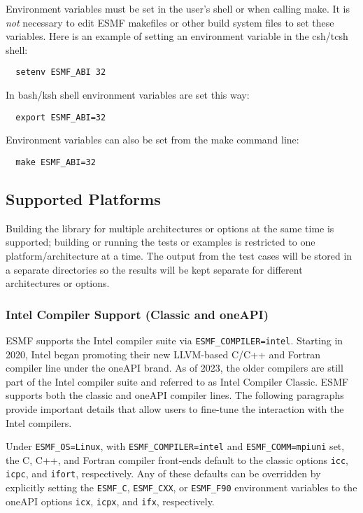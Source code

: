 Environment variables must be set in the user's shell or when calling make. It
is {\em not} necessary to edit ESMF makefiles or other build system files to set
these variables. Here is an example of setting an environment variable in the
csh/tcsh shell:

\begin{verbatim}
  setenv ESMF_ABI 32
\end{verbatim}

In bash/ksh shell environment variables are set this way:

\begin{verbatim}
  export ESMF_ABI=32
\end{verbatim}

Environment variables can also be set from the make command line:

\begin{verbatim}
  make ESMF_ABI=32
\end{verbatim}

\subsection{Supported Platforms}


Building the library for multiple architectures or options at the same
time is supported; building or running the tests or examples is restricted
to one platform/architecture at a time.  The output from the test cases
will be stored in a separate directories so the results will be kept
separate for different architectures or options.

\subsubsection{Intel Compiler Support (Classic and oneAPI)}

ESMF supports the Intel compiler suite via {\tt ESMF\_COMPILER=intel}. Starting in 2020, Intel began promoting their
new LLVM-based C/C++ and Fortran compiler line under the oneAPI brand. As of 2023, the older compilers are still
part of the Intel compiler suite and referred to as Intel Compiler Classic. ESMF supports both the classic and oneAPI
compiler lines. The following paragraphs provide important details that allow users to fine-tune the interaction
with the Intel compilers.

Under {\tt ESMF\_OS=Linux}, with {\tt ESMF\_COMPILER=intel} and {\tt ESMF\_COMM=mpiuni} set, the C, C++, and
Fortran compiler front-ends default to the classic options {\tt icc}, {\tt icpc}, and {\tt ifort}, respectively. Any
of these defaults can be overridden by explicitly setting the {\tt ESMF\_C}, {\tt ESMF\_CXX}, or {\tt ESMF\_F90}
environment variables to the oneAPI options {\tt icx}, {\tt icpx}, and {\tt ifx}, respectively.

